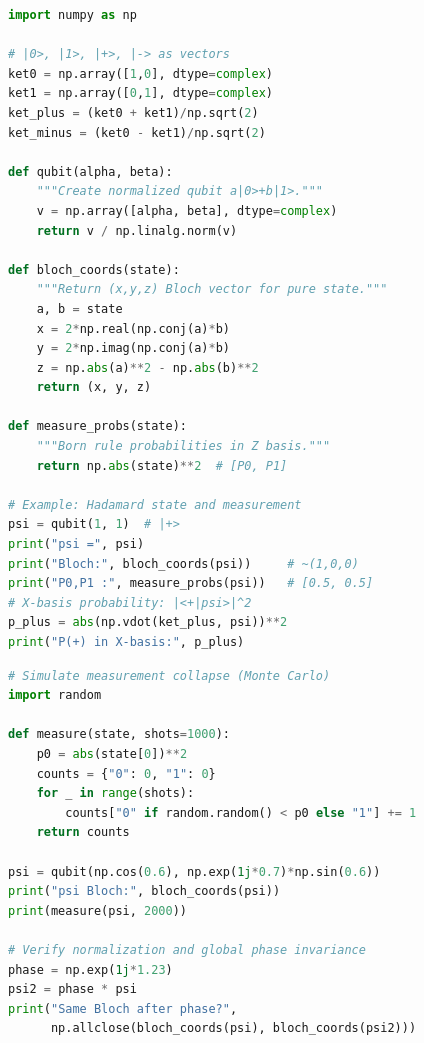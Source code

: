 \begin{lstlisting}[language=Python]
import numpy as np

# |0>, |1>, |+>, |-> as vectors
ket0 = np.array([1,0], dtype=complex)
ket1 = np.array([0,1], dtype=complex)
ket_plus = (ket0 + ket1)/np.sqrt(2)
ket_minus = (ket0 - ket1)/np.sqrt(2)

def qubit(alpha, beta):
    """Create normalized qubit a|0>+b|1>."""
    v = np.array([alpha, beta], dtype=complex)
    return v / np.linalg.norm(v)

def bloch_coords(state):
    """Return (x,y,z) Bloch vector for pure state."""
    a, b = state
    x = 2*np.real(np.conj(a)*b)
    y = 2*np.imag(np.conj(a)*b)
    z = np.abs(a)**2 - np.abs(b)**2
    return (x, y, z)

def measure_probs(state):
    """Born rule probabilities in Z basis."""
    return np.abs(state)**2  # [P0, P1]

# Example: Hadamard state and measurement
psi = qubit(1, 1)  # |+>
print("psi =", psi)
print("Bloch:", bloch_coords(psi))     # ~(1,0,0)
print("P0,P1 :", measure_probs(psi))   # [0.5, 0.5]
# X-basis probability: |<+|psi>|^2
p_plus = abs(np.vdot(ket_plus, psi))**2
print("P(+) in X-basis:", p_plus)
\end{lstlisting}

\begin{lstlisting}[language=Python]
# Simulate measurement collapse (Monte Carlo)
import random

def measure(state, shots=1000):
    p0 = abs(state[0])**2
    counts = {"0": 0, "1": 0}
    for _ in range(shots):
        counts["0" if random.random() < p0 else "1"] += 1
    return counts

psi = qubit(np.cos(0.6), np.exp(1j*0.7)*np.sin(0.6))
print("psi Bloch:", bloch_coords(psi))
print(measure(psi, 2000))

# Verify normalization and global phase invariance
phase = np.exp(1j*1.23)
psi2 = phase * psi
print("Same Bloch after phase?",
      np.allclose(bloch_coords(psi), bloch_coords(psi2)))
\end{lstlisting}


